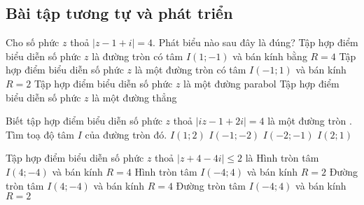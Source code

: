 \subsection{Bài tập tương tự và phát triển}
\begin{ex}%
	Cho số phức $z$ thoả $\left|z-1+i\right|=4$. Phát biểu nào sau đây là đúng?
	\choice
	{\True Tập hợp điểm biểu diễn số phức $z$ là đường tròn có tâm $I(1;-1)$ và bán kính bằng $R=4$}
	{Tập hợp điểm biểu diễn số phức $z$ là một đường tròn có tâm $I(-1;1)$ và bán kính  $R=2$}
	{Tập hợp điểm biểu diễn số phức $z$ là một đường parabol}
	{Tập hợp điểm biểu diễn số phức $z$ là một đường thẳng }
	\end{ex}
\begin{ex}%
Biết tập hợp điểm biểu diễn số phức $z$ thoả $\left|iz-1+2i\right|=4$ là một đường tròn . Tìm toạ độ tâm $I$ của đường tròn đó.
\choice
{$I(1;2)$}
{$I(-1;-2)$}
{\True$I(-2;-1)$}
{$I(2;1)$}
\end{ex}
\begin{ex}%
Tập hợp điểm biểu diễn số phức $z$ thoả $\left|z+4-4i\right|\leq  2$ là 
	\choice
{Hình tròn tâm $I(4;-4)$ và bán kính $R=4$}
{\True Hình tròn tâm $I(-4;4)$ và bán kính $R=2$}
{Đường tròn tâm $I(4;-4)$ và bán kính $R=4$}
{Đường tròn tâm $I(-4;4)$ và bán kính $R=2$}
	
\end{ex}

